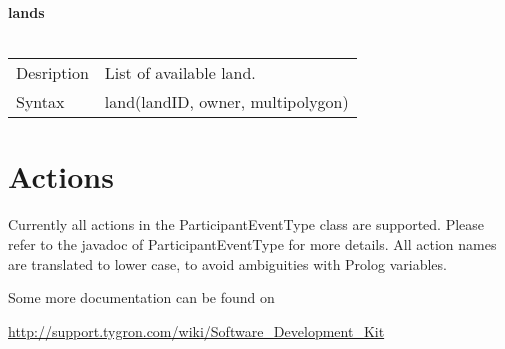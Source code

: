 \documentclass[english,11pt]{article}
\begin{document}
\textbf{lands}\\
\\
\begin{tabularx}{\textwidth}{lX}
 Desription & List of available land. \\
 Syntax & land(landID, owner, multipolygon) \\
\end{tabularx}
\newline



\section{Actions}

Currently all actions in the ParticipantEventType class are supported. Please refer to the javadoc of ParticipantEventType for more details. All action names are translated to lower case, to avoid ambiguities with Prolog variables.

Some more documentation can be found on

\url{http://support.tygron.com/wiki/Software_Development_Kit}
\end{document}
